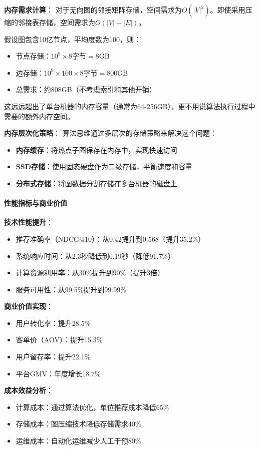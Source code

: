 \textbf{内存需求计算}：
对于无向图的邻接矩阵存储，空间需求为$O(|V|^2)$。即使采用压缩的邻接表存储，空间需求为$O(|V|+|E|)$。

假设图包含10亿节点，平均度数为100，则：
\begin{itemize}
\item 节点存储：$10^9 \times 8\text{字节} = 8\text{GB}$
\item 边存储：$10^9 \times 100 \times 8\text{字节} = 800\text{GB}$
\item 总需求：约808GB（不考虑索引和其他开销）
\end{itemize}

这远远超出了单台机器的内存容量（通常为64-256GB），更不用说算法执行过程中需要的额外内存空间。

\textbf{内存层次化策略}：
算法思维通过多层次的存储策略来解决这个问题：
\begin{itemize}
\item \textbf{内存缓存}：将热点子图保存在内存中，实现快速访问
\item \textbf{SSD存储}：使用固态硬盘作为二级存储，平衡速度和容量
\item \textbf{分布式存储}：将图数据分割存储在多台机器的磁盘上
\end{itemize}

\paragraph{性能指标与商业价值}

\textbf{技术性能提升}：
\begin{itemize}
\item 推荐准确率（NDCG@10）：从0.42提升到0.568（提升35.2\%）
\item 系统响应时间：从2.3秒降低到0.19秒（降低91.7\%）
\item 计算资源利用率：从30\%提升到90\%（提升3倍）
\item 服务可用性：从99.5\%提升到99.99\%
\end{itemize}

\textbf{商业价值实现}：
\begin{itemize}
\item 用户转化率：提升28.5\%
\item 客单价（AOV）：提升15.3\%
\item 用户留存率：提升22.1\%
\item 平台GMV：年度增长18.7\%
\end{itemize}

\textbf{成本效益分析}：
\begin{itemize}
\item 计算成本：通过算法优化，单位推荐成本降低65\%
\item 存储成本：图压缩技术降低存储需求40\%
\item 运维成本：自动化运维减少人工干预80\%
\end{itemize}

